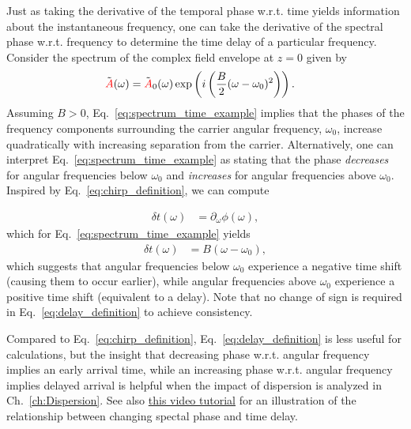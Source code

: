 Just as taking the derivative of the temporal phase w.r.t. time yields information about the instantaneous frequency, one can take the derivative of the spectral phase w.r.t. frequency to determine the time delay of a particular frequency. Consider the spectrum of the complex field envelope at $z=0$ given by
\begin{align}
\label{eq:spectrum_time_example}
    \Tilde{\textcolor{red}{A}}(\omega) &= \Tilde{\textcolor{red}{A}}_0(\omega)\exp\left( i\left(\frac{B}{2}(\omega-\omega_0)^2 \right)   \right).
\end{align}
Assuming $B>0$, Eq.~\ref{eq:spectrum_time_example} implies that the phases of the frequency components surrounding the carrier angular frequency, $\omega_0$, increase quadratically with increasing separation from the carrier. Alternatively, one can interpret Eq.~\ref{eq:spectrum_time_example} as stating that the phase \emph{decreases} for angular frequencies below $\omega_0$ and \emph{increases} for angular frequencies above $\omega_0$. Inspired by Eq.~\ref{eq:chirp_definition}, we can compute

\begin{align}
\label{eq:delay_definition}
    \delta t(\omega) &= \partial_\omega\phi(\omega),
\end{align}
which for Eq.~\ref{eq:spectrum_time_example} yields
\begin{align}
    \delta t(\omega) &=  B(\omega-\omega_0),
\end{align}
which suggests that angular frequencies below $\omega_0$ experience a negative time shift (causing them to occur earlier), while angular frequencies above $\omega_0$ experience a positive time shift (equivalent to a delay). Note that no change of sign is required in Eq.~\ref{eq:delay_definition} to achieve consistency. 

Compared to Eq.~\ref{eq:chirp_definition}, Eq.~\ref{eq:delay_definition} is less useful for calculations, but the insight that decreasing phase w.r.t. angular frequency implies an early arrival time, while an increasing phase w.r.t. angular frequency implies delayed arrival is helpful when the impact of dispersion is analyzed in Ch.~\ref{ch:Dispersion}. See also \href{https://youtu.be/E3S0BQiy3p8}{this video tutorial} for an illustration of the relationship between changing spectal phase and time delay.  
 






